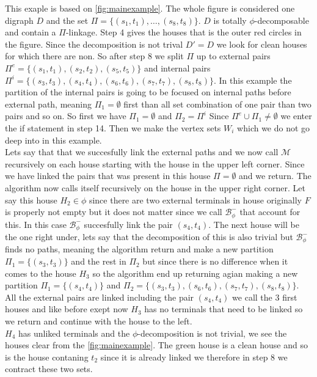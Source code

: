 \begin{example}
    This exaple  is based on \autoref{fig:mainexample}.
    The whole figure is considered one digraph $D$ and the set $\Pi = \lbrace (s_1,t_1),\dots ,(s_8,t_8)\rbrace$.
    $D$ is totally $\phi$-decomposable and contain a $\Pi$-linkage. 
    Step 4 gives the houses that is the outer red circles in the figure. 
    Since the decomposition is not trival $D'=D$ we look for clean houses for which there are non. So after step 8 we split $\Pi$ up to external pairs $\Pi^e=\lbrace (s_1,t_1),(s_2,t_2),(s_5,t_5)\rbrace$ and internal pairs $\Pi^i=\lbrace (s_3,t_3), (s_4,t_4), (s_6,t_6),(s_7,t_7),(s_8,t_8)\rbrace$. 
    In this example the partition of the internal pairs is going to be focused on internal paths before external path, meaning $\Pi_1=\emptyset$ first than all set combination of one pair than two pairs and so on.
    So first we have $\Pi_1=\emptyset$ and $\Pi_2=\Pi^i$
    Since $\Pi^e\cup \Pi_1\neq \emptyset$ we enter the if statement in step 14. 
    Then we make the vertex sets $W_i$ which we do not go deep into in this example.\\ 
    Lets say that that we succesfully link the external paths and we now call $\mathcal{M}$ recursively on each house starting with the house in the upper left corner.
    Since we have linked the pairs that was present in this house $\Pi=\emptyset$ and we return. 
    The algorithm now calls itself recursively on the house in the upper right corner.
    Let say this house $H_2\in \phi$ since there are two external terminals in house originally $F$ is properly not empty but it does not matter since we call $\mathcal{B}_{\phi}^-$ that account for this.
    In this case $\mathcal{B}_{\phi}^-$ succesfully link the pair $(s_4,t_4)$.  
    The next house will be the one right under, lets say that the decomposition of this is also trivial but $\mathcal{B}_{\phi}^-$ finds no paths, meaning the algorithm return and make a new partition $\Pi_1=\lbrace (s_3,t_3) \rbrace$ and the rest in $\Pi_2$ but since there is no difference when it comes to the house $H_3$ so the algorithm end up  returning agian making a new partition $\Pi_1=\lbrace (s_4,t_4) \rbrace$ and $\Pi_2=\lbrace (s_3,t_3),(s_6,t_6),(s_7,t_7),(s_8,t_8)\rbrace$. 
    All the external pairs are linked including the pair $(s_4,t_4)$ we call the 3 first houses and like before exept now $H_3$ has no terminals that need to be linked so we return and continue with the house to the left.\\
    $H_4$ has unliked terminals and the $\phi$-decomposition is not trivial, we see the houses clear from the \autoref{fig:mainexample}. The green house is a clean house and so is the house contaning $t_2$ since it is already linked we therefore in step 8 we contract these two sets. 

\end{example}
